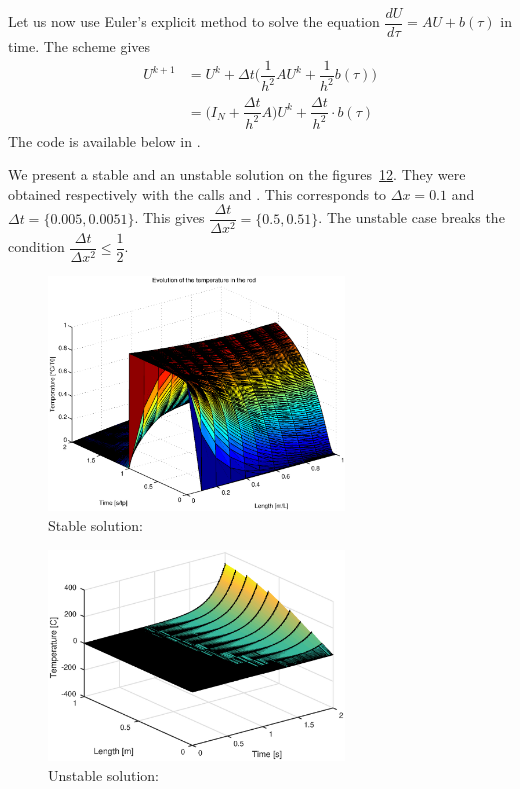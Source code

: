 Let us now use Euler's explicit method to solve the equation $\dfrac{dU}{d \tau}= AU+b(\tau)$ in time. The scheme gives
\begin{align*}
U^{k+1} &= U^{k} + \Delta t\Big(\dfrac{1}{h^2}AU^{k}+\dfrac{1}{h^2}b(\tau)\Big)\\
 &= \Big( I_{N} + \dfrac{\Delta t}{h^2} A\Big)U^{k} + \dfrac{\Delta t}{h^2}\cdot b(\tau)
\end{align*}
The code is available below in .

We present a stable and an unstable solution on the figures~\ref{fig:stable}\ref{fig:unstable}.
They were obtained respectively with the calls  and . This corresponds to $\Delta x = 0.1$ and $\Delta t = \{0.005, 0.0051 \}$. This gives $\dfrac{\Delta t}{\Delta x^2}= \{0.5,0.51\}$. The unstable case breaks the condition $\dfrac{\Delta t}{\Delta x^2}\leq \dfrac{1}{2}$.


\begin{figure}[!h]
\centering
\includegraphics[width = 0.7\textwidth]{./stable.eps}
\caption{Stable solution: }
\label{fig:stable}
\end{figure}

\begin{figure}[!h]
\centering
\includegraphics[width = 0.7\textwidth]{./unstable.eps}
\caption{Unstable solution: }
\label{fig:unstable}
\end{figure}
\FloatBarrier
